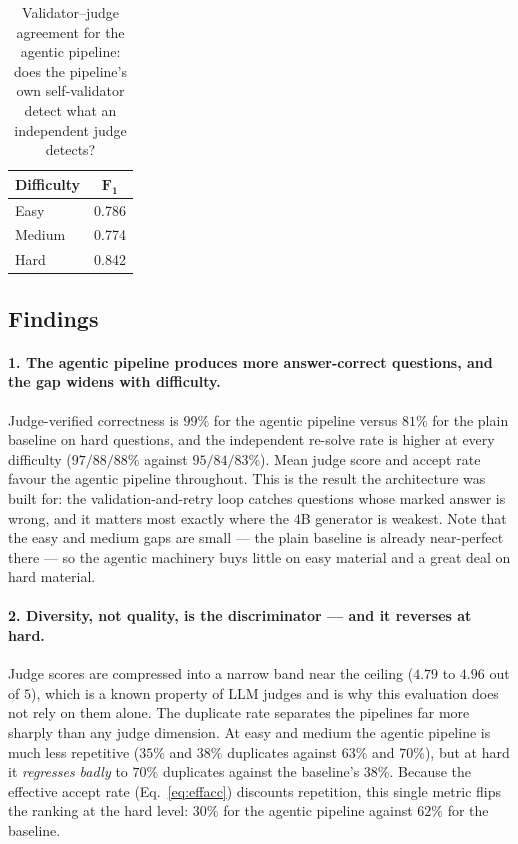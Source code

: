 \begin{table}[H]
\centering
\caption{Validator--judge agreement for the agentic pipeline: does the pipeline's own
self-validator detect what an independent judge detects?}
\label{tab:bulk-f1}
\small
\begin{tabular}{|l|c|}
\hline
\textbf{Difficulty} & $\mathbf{F_1}$ \\
\hline
Easy   & 0.786 \\
Medium & 0.774 \\
Hard   & 0.842 \\
\hline
\end{tabular}
\end{table}

\subsection{Findings}
\label{sec:res-findings}

\paragraph{1. The agentic pipeline produces more answer-correct questions, and the
gap widens with difficulty.} Judge-verified correctness is $99\%$ for the agentic
pipeline versus $81\%$ for the plain baseline on hard questions, and the independent
re-solve rate is higher at every difficulty ($97/88/88\%$ against $95/84/83\%$). Mean
judge score and accept rate favour the agentic pipeline throughout. This is the
result the architecture was built for: the validation-and-retry loop catches
questions whose marked answer is wrong, and it matters most exactly where the $4$B
generator is weakest. Note that the easy and medium gaps are small --- the plain
baseline is already near-perfect there --- so the agentic machinery buys little on
easy material and a great deal on hard material.

\paragraph{2. Diversity, not quality, is the discriminator --- and it reverses at
hard.} Judge scores are compressed into a narrow band near the ceiling ($4.79$ to
$4.96$ out of $5$), which is a known property of LLM judges and is why this
evaluation does not rely on them alone. The duplicate rate separates the pipelines
far more sharply than any judge dimension. At easy and medium the agentic pipeline is
much less repetitive ($35\%$ and $38\%$ duplicates against $63\%$ and $70\%$), but at
hard it \emph{regresses badly} to $70\%$ duplicates against the baseline's $38\%$.
Because the effective accept rate (Eq.~\ref{eq:effacc}) discounts repetition, this
single metric flips the ranking at the hard level: $30\%$ for the agentic pipeline
against $62\%$ for the baseline.


